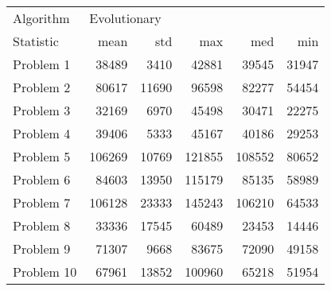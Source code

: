 \begin{tabular}{lrrrrr}
\toprule
Algorithm & \multicolumn{5}{l}{Evolutionary} \\
Statistic &         mean &    std &     max &     med &    min \\
\midrule
Problem 1  &        38489 &   3410 &   42881 &   39545 &  31947 \\
Problem 2  &        80617 &  11690 &   96598 &   82277 &  54454 \\
Problem 3  &        32169 &   6970 &   45498 &   30471 &  22275 \\
Problem 4  &        39406 &   5333 &   45167 &   40186 &  29253 \\
Problem 5  &       106269 &  10769 &  121855 &  108552 &  80652 \\
Problem 6  &        84603 &  13950 &  115179 &   85135 &  58989 \\
Problem 7  &       106128 &  23333 &  145243 &  106210 &  64533 \\
Problem 8  &        33336 &  17545 &   60489 &   23453 &  14446 \\
Problem 9  &        71307 &   9668 &   83675 &   72090 &  49158 \\
Problem 10 &        67961 &  13852 &  100960 &   65218 &  51954 \\
\bottomrule
\end{tabular}
